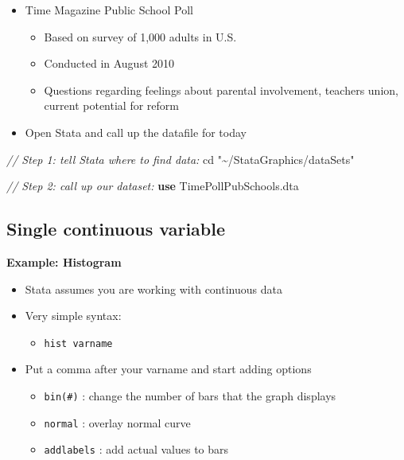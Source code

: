 \documentclass[
]{book}
\newenvironment{Shaded}{\begin{snugshade}}{\end{snugshade}}
\newcommand{\CommentTok}[1]{\textcolor[rgb]{0.56,0.35,0.01}{\textit{#1}}}
\newcommand{\KeywordTok}[1]{\textcolor[rgb]{0.13,0.29,0.53}{\textbf{#1}}}
\newcommand{\NormalTok}[1]{#1}
\newcommand{\StringTok}[1]{\textcolor[rgb]{0.31,0.60,0.02}{#1}}
\providecommand{\tightlist}{%
  \setlength{\itemsep}{0pt}\setlength{\parskip}{0pt}}
\begin{document}
\begin{itemize}
\tightlist
\item
  Time Magazine Public School Poll

  \begin{itemize}
  \tightlist
  \item
    Based on survey of 1,000 adults in U.S.
  \item
    Conducted in August 2010
  \item
    Questions regarding feelings about parental involvement, teachers union, current potential for reform
  \end{itemize}
\item
  Open Stata and call up the datafile for today
\end{itemize}

\begin{Shaded}
\begin{Highlighting}[]
\CommentTok{// Step 1: tell Stata where to find data:}
\NormalTok{cd }\StringTok{"\textasciitilde{}/StataGraphics/dataSets"}

\CommentTok{// Step 2: call up our dataset:}
\KeywordTok{use}\NormalTok{ TimePollPubSchools.dta}
\end{Highlighting}
\end{Shaded}

\hypertarget{single-continuous-variable}{%
\subsection{Single continuous variable}\label{single-continuous-variable}}

\textbf{Example: Histogram}

\begin{itemize}
\tightlist
\item
  Stata assumes you are working with continuous data
\item
  Very simple syntax:

  \begin{itemize}
  \tightlist
  \item
    \texttt{hist\ varname}
  \end{itemize}
\item
  Put a comma after your varname and start adding options

  \begin{itemize}
  \tightlist
  \item
    \texttt{bin(\#)} : change the number of bars that the graph displays
  \item
    \texttt{normal} : overlay normal curve
  \item
    \texttt{addlabels} : add actual values to bars
  \end{itemize}
\end{itemize}
\end{document}
